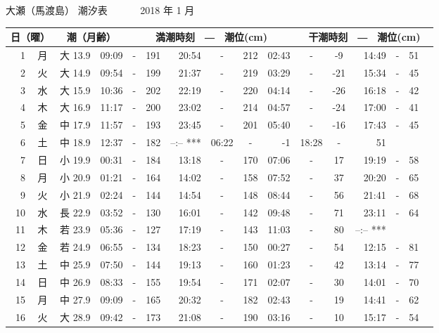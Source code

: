 \documentclass[12pt.a4j]{jsarticle}
\begin{document}
\pagestyle{empty}
\begin{center}
 {\LARGE 大瀬（馬渡島）  潮汐表　　　}
 {\large 2018 年  1 月}\\
 \begin{table}[ht]
 \begin{tabular}{|rc|cr|ccrccr|ccrccr|}
 \hline
 \multicolumn{2}{|c|}{日（曜）} & \multicolumn{2}{c|}{潮（月齢）} & \multicolumn{6}{c|}{満潮時刻　―　潮位(cm)} & \multicolumn{6}{c|}{干潮時刻　―　潮位(cm)} \\
 \hline
 1 & 月 & 大 13.9 & 09:09 &-& 191 & 20:54 &-& 212 & 02:43 &-&  -9 & 14:49 &-&  51 \\
\hline
 2 & 火 & 大 14.9 & 09:54 &-& 199 & 21:37 &-& 219 & 03:29 &-& -21 & 15:34 &-&  45 \\
\hline
 3 & 水 & 大 15.9 & 10:36 &-& 202 & 22:19 &-& 220 & 04:14 &-& -26 & 16:18 &-&  42 \\
\hline
 4 & 木 & 大 16.9 & 11:17 &-& 200 & 23:02 &-& 214 & 04:57 &-& -24 & 17:00 &-&  41 \\
\hline
 5 & 金 & 中 17.9 & 11:57 &-& 193 & 23:45 &-& 201 & 05:40 &-& -16 & 17:43 &-&  45 \\
\hline
 6 & 土 & 中 18.9 & 12:37 &-& 182 & --:--   *** & 06:22 &-&  -1 & 18:28 &-&  51 \\
\hline
 7 & 日 & 小 19.9 & 00:31 &-& 184 & 13:18 &-& 170 & 07:06 &-&  17 & 19:19 &-&  58 \\
\hline
 8 & 月 & 小 20.9 & 01:21 &-& 164 & 14:02 &-& 158 & 07:52 &-&  37 & 20:20 &-&  65 \\
\hline
 9 & 火 & 小 21.9 & 02:24 &-& 144 & 14:54 &-& 148 & 08:44 &-&  56 & 21:41 &-&  68 \\
\hline
10 & 水 & 長 22.9 & 03:52 &-& 130 & 16:01 &-& 142 & 09:48 &-&  71 & 23:11 &-&  64 \\
\hline
11 & 木 & 若 23.9 & 05:36 &-& 127 & 17:19 &-& 143 & 11:03 &-&  80 & --:--   *** \\
\hline
12 & 金 & 若 24.9 & 06:55 &-& 134 & 18:23 &-& 150 & 00:27 &-&  54 & 12:15 &-&  81 \\
\hline
13 & 土 & 中 25.9 & 07:50 &-& 144 & 19:13 &-& 160 & 01:23 &-&  42 & 13:14 &-&  77 \\
\hline
14 & 日 & 中 26.9 & 08:33 &-& 155 & 19:54 &-& 171 & 02:07 &-&  30 & 14:01 &-&  70 \\
\hline
15 & 月 & 中 27.9 & 09:09 &-& 165 & 20:32 &-& 182 & 02:43 &-&  19 & 14:41 &-&  62 \\
\hline
16 & 火 & 大 28.9 & 09:42 &-& 173 & 21:08 &-& 190 & 03:16 &-&  10 & 15:17 &-&  54 \\

\end{tabular}
\end{table}
\end{center}
\end{document}

